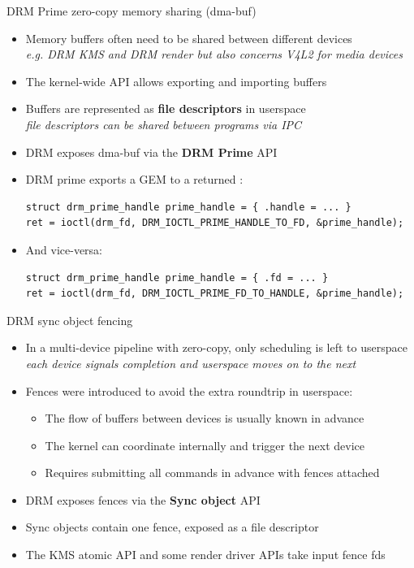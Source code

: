 \begin{frame}[fragile]{DRM Prime zero-copy memory sharing (dma-buf)}
  \begin{itemize}
  \item Memory buffers often need to be shared between different devices\\
    \textit{e.g. DRM KMS and DRM render but also concerns V4L2 for media devices}
  \item The kernel-wide  API allows exporting and importing buffers
  \item Buffers are represented as \textbf{file descriptors} in userspace\\
    \textit{file descriptors can be shared between programs via IPC}
  \item DRM exposes dma-buf via the \textbf{DRM Prime} API
  \item DRM prime exports a GEM  to a returned :
  \begin{verbatim}
struct drm_prime_handle prime_handle = { .handle = ... }
ret = ioctl(drm_fd, DRM_IOCTL_PRIME_HANDLE_TO_FD, &prime_handle);
  \end{verbatim}
  \item And vice-versa:
  \begin{verbatim}
struct drm_prime_handle prime_handle = { .fd = ... }
ret = ioctl(drm_fd, DRM_IOCTL_PRIME_FD_TO_HANDLE, &prime_handle);
  \end{verbatim}
  \end{itemize}
\end{frame}

\begin{frame}[fragile]{DRM sync object fencing}
  \begin{itemize}
  \item In a multi-device pipeline with zero-copy, only scheduling is left to userspace\\
  \textit{each device signals completion and userspace moves on to the next}
  \item Fences were introduced to avoid the extra roundtrip in userspace:
    \begin{itemize}
    \item The flow of buffers between devices is usually known in advance
    \item The kernel can coordinate internally and trigger the next device
    \item Requires submitting all commands in advance with fences attached
    \end{itemize}
  \item DRM exposes fences via the \textbf{Sync object} API
  \item Sync objects contain one fence, exposed as a file descriptor
  \item The KMS atomic API and some render driver APIs take input fence fds
  \end{itemize}
\end{frame}

